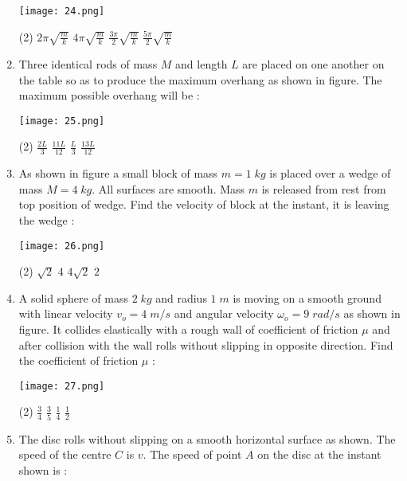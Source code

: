 \documentclass{article}
\begin{document}
\begin{enumerate}
\texttt{[image: 24.png]}

\begin{tasks}(2)
\task \(\displaystyle 2\pi \sqrt{\frac{m}{k}} \)
\task \(\displaystyle 4\pi \sqrt{\frac{m}{k}} \)
\task \(\displaystyle \frac{3\pi}{2} \sqrt{\frac{m}{k}} \)
\task \(\displaystyle \frac{5\pi}{2} \sqrt{\frac{m}{k}} \)
\end{tasks}
\item Three identical rods of mass \(M\) and length \(L\)  are placed on one another on the table so as to produce the maximum overhang as shown in figure. The maximum possible overhang will be :

\texttt{[image: 25.png]}

\begin{tasks}(2)
\task \(\displaystyle \frac{2L}{3} \)
\task \(\displaystyle \frac{11L}{12} \)
\task \(\displaystyle \frac{L}{3} \)
\task \(\displaystyle \frac{13L}{12} \)
\end{tasks}
\item As shown in figure a small block of mass \(m = 1\; kg\) is placed over a wedge of mass \(M = 4\; kg\). All surfaces are smooth. Mass \(m\) is released from rest from top position of wedge. Find the velocity of block at the instant, it is leaving the wedge :

\texttt{[image: 26.png]}

\begin{tasks}(2)
\task \(\sqrt{2}\)
\task \(4 \)
\task \(4\sqrt{2}\)
\task \(2 \)
\end{tasks}
\item A solid sphere of mass \(2\;kg\) and radius \(1\;m\) is moving on a smooth ground with linear velocity \(v_o = 4\; m/s\) and angular velocity \(\omega_o=9 \;rad/s\) as shown in figure. It collides elastically with a rough wall of coefficient of friction \(\mu\) and after collision with the wall rolls without slipping in opposite direction. Find the coefficient of friction \(\mu\) :

\texttt{[image: 27.png]}

\begin{tasks}(2)
\task \(\displaystyle\frac{3}{4}\)
\task \(\displaystyle\frac{3}{5}\)
\task \(\displaystyle\frac{1}{4}\)
\task \(\displaystyle\frac{1}{2} \)
\end{tasks}
\item The disc rolls without slipping on a smooth horizontal surface as shown. The speed of the centre \(C\) is \(v\). The speed of point \(A\) on the disc at the instant shown is :


\end{enumerate}
\end{document}
